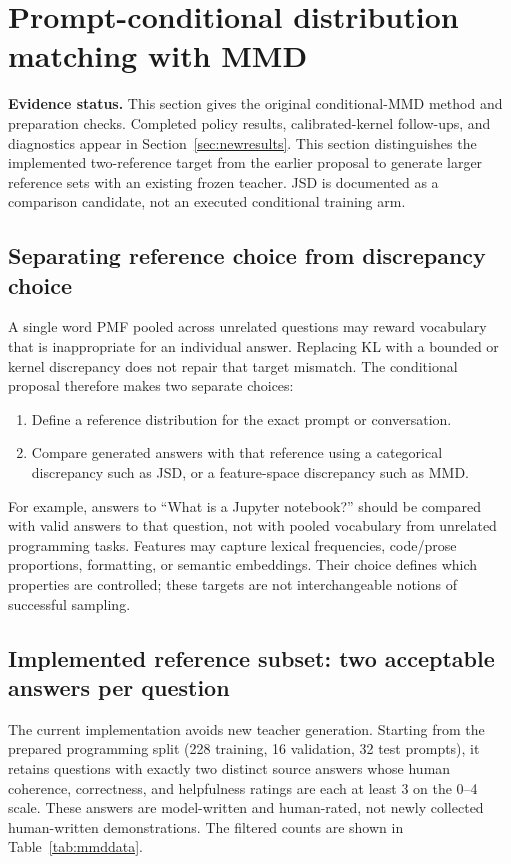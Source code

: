 \section{Prompt-conditional distribution matching with MMD}
\label{sec:mmd}
\noindent\textbf{Evidence status.} This section gives the original
conditional-MMD method and preparation checks. Completed policy results,
calibrated-kernel follow-ups, and diagnostics appear in
Section~\ref{sec:newresults}. This section distinguishes the
implemented two-reference target from the earlier proposal to generate
larger reference sets with an existing frozen teacher. JSD is documented
as a comparison candidate, not an executed conditional training arm.

\subsection{Separating reference choice from discrepancy choice}
A single word PMF pooled across unrelated questions may reward vocabulary
that is inappropriate for an individual answer. Replacing KL with a
bounded or kernel discrepancy does not repair that target mismatch.
The conditional proposal therefore makes two separate choices:
\begin{enumerate}
\item Define a reference distribution for the exact prompt or conversation.
\item Compare generated answers with that reference using a categorical
discrepancy such as JSD, or a feature-space discrepancy such as MMD.
\end{enumerate}
For example, answers to ``What is a Jupyter notebook?'' should be compared
with valid answers to that question, not with pooled vocabulary from
unrelated programming tasks. Features may capture lexical frequencies,
code/prose proportions, formatting, or semantic embeddings. Their choice
defines which properties are controlled; these targets are not
interchangeable notions of successful sampling.

\subsection{Implemented reference subset: two acceptable answers per question}
The current implementation avoids new teacher generation. Starting from
the prepared programming split (228 training, 16 validation, 32 test
prompts), it retains questions with exactly two distinct source answers
whose human coherence, correctness, and helpfulness ratings are each
at least 3 on the 0--4 scale. These answers are model-written and
human-rated, not newly collected human-written demonstrations.
The filtered counts are shown in Table~\ref{tab:mmddata}.

